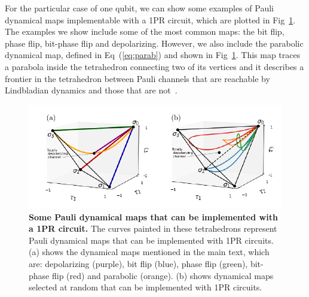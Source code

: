 \documentclass[10pt,letterpaper]{article} %
\newcommand{\fref}[1]{Fig~\ref{#1}}
\newcommand{\eref}[1]{Eq~(\ref{#1})}
\providecommand{\DIFaddbeginFL}{} %
\providecommand{\DIFaddendFL}{} %
\newcommand{\DIFaddincludegraphics}[2][]{{\color{blue}\fbox{\DIFOincludegraphics[#1]{#2}}}} %
\DeclareRobustCommand{\DIFaddbeginFL}{\DIFOaddbeginFL \let\includegraphics\DIFaddincludegraphics} %
\DeclareRobustCommand{\DIFaddendFL}{\DIFOaddendFL \let\includegraphics\DIFOincludegraphics} %
\begin{document}
For the particular case of one qubit, we can show some examples of Pauli
dynamical maps implementable with a 1PR circuit, which are plotted in
\fref{Fig5}. 
The examples we show include some of the most common maps: the bit flip, phase flip, bit-phase flip and depolarizing.
However, we also include the parabolic dynamical map,
defined in \eref{eq:parab} and shown in \fref{Fig5}.
This map traces a parabola inside the tetrahedron connecting two of its vertices
and it describes a frontier in the tetrahedron between Pauli channels
that are reachable by Lindbladian dynamics and those that are not~\cite{Davalos}.

\begin{figure} %
\centering
\DIFaddbeginFL \includegraphics{fig-curves.pdf}
\DIFaddendFL \caption{{\bf Some Pauli dynamical maps that can be implemented with a 1PR circuit.}
The curves painted in these tetrahedrons
represent Pauli dynamical maps that can be implemented with 1PR circuits.
(a) shows the dynamical maps mentioned in the main 
text, which are: depolarizing (purple), bit flip (blue),
phase flip (green), bit-phase flip (red)
and parabolic (orange).
(b) shows dynamical maps selected at random that can be implemented with 1PR 
circuits.}
\label{Fig5}
\end{figure} %
\end{document}
